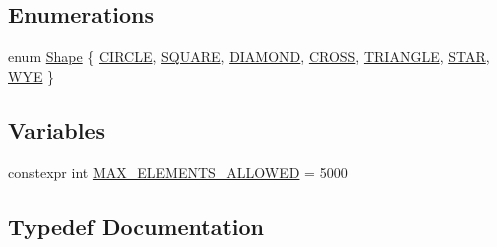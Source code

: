 \subsection*{Enumerations}
\begin{DoxyCompactItemize}
\item 
enum \hyperlink{namespacebridges_1_1datastructure_a3408f5f44d9c6062e5f3adb7e1bbb7f0}{Shape} \{ \newline
\hyperlink{namespacebridges_1_1datastructure_a3408f5f44d9c6062e5f3adb7e1bbb7f0a18ad7c088ebdda05673a1a586eede99a}{C\+I\+R\+C\+LE}, 
\hyperlink{namespacebridges_1_1datastructure_a3408f5f44d9c6062e5f3adb7e1bbb7f0a63cd254f1ceccbe871f60e3b7f0666d5}{S\+Q\+U\+A\+RE}, 
\hyperlink{namespacebridges_1_1datastructure_a3408f5f44d9c6062e5f3adb7e1bbb7f0a170d2d8b57d448ed19e563ee3cd28b35}{D\+I\+A\+M\+O\+ND}, 
\hyperlink{namespacebridges_1_1datastructure_a3408f5f44d9c6062e5f3adb7e1bbb7f0ab6afc15f9badffaf05a23b3f1ba1081a}{C\+R\+O\+SS}, 
\newline
\hyperlink{namespacebridges_1_1datastructure_a3408f5f44d9c6062e5f3adb7e1bbb7f0ab1bf469052aa5abf241c54f8331b6fc4}{T\+R\+I\+A\+N\+G\+LE}, 
\hyperlink{namespacebridges_1_1datastructure_a3408f5f44d9c6062e5f3adb7e1bbb7f0a995b35f7cf12b5842d94aba9ce5c8b4d}{S\+T\+AR}, 
\hyperlink{namespacebridges_1_1datastructure_a3408f5f44d9c6062e5f3adb7e1bbb7f0aa0494702a25d198f538266dcb8ba52df}{W\+YE}
 \}
\end{DoxyCompactItemize}
\subsection*{Variables}
\begin{DoxyCompactItemize}
\item 
constexpr int \hyperlink{namespacebridges_1_1datastructure_a2e75baaa66b6c9cd3f5c5f598b2c8147}{M\+A\+X\+\_\+\+E\+L\+E\+M\+E\+N\+T\+S\+\_\+\+A\+L\+L\+O\+W\+ED} = 5000
\end{DoxyCompactItemize}


\subsection{Typedef Documentation}
\mbox{\label{namespacebridges_1_1datastructure_a72ff4f4c6720d9c7f9fb29141cc341c1}} 
